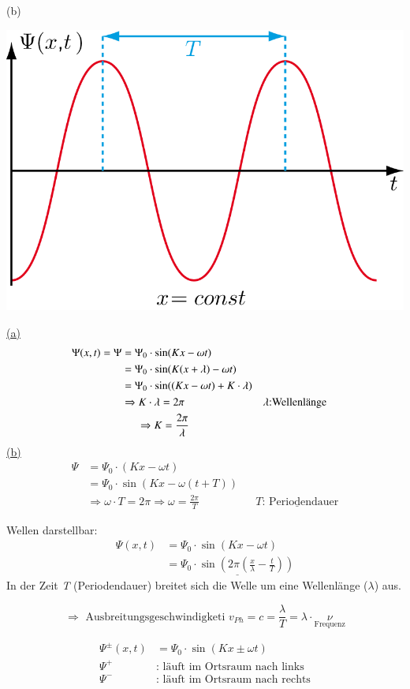 \hypertarget{b}{(b)} \begin{center}
	\includegraphics[width=0.5\linewidth]{skizzen/19/19B10}
\end{center}
\hyperlink{a}{(a)}
\begin{align*}
\Psi(x,t) = \Psi &= \Psi_0 \cdot \sin(Kx-\omega t)\\
&= \Psi_0 \cdot \sin(K(x+\lambda)-\omega t)\\
&= \Psi_0 \cdot \sin((Kx-\omega t)+K\cdot \lambda)\\
&\Rightarrow K \cdot \lambda = 2\pi &&\lambda \text{:Wellenlänge}\\
&\hspace{5mm} \Rightarrow K = \frac{2\pi}{\lambda}
\end{align*}
\hyperlink{b}{(b)}
\begin{align*}
\Psi &= \Psi_0 \cdot (Kx-\omega t)\\
&= \Psi_0 \cdot \sin(Kx-\omega (t+T))\\
&\Rightarrow\omega \cdot T = 2\pi \Rightarrow \omega = \frac{2\pi}{T} && \underline{T\text{: Periodendauer}}
\end{align*}

Wellen darstellbar:
\begin{align*}
\Psi(x,t) &= \Psi_0 \cdot \sin(Kx-\omega t)\\
&= \underline{\Psi_0 \cdot \sin (2\pi(\frac{x}{\lambda} - \frac{t}{T}))}
\end{align*}
In der Zeit \emph{T} (Periodendauer) breitet sich die Welle um eine Wellenlänge ($ \lambda $) aus.

$$ \Rightarrow \text{ Ausbreitungsgeschwindigketi } \boxed{ v_{Ph} = c = \frac{\lambda}{T} = \lambda \cdot \underset{\text{Frequenz}}{\nu} } $$

\begin{align*}
\Psi^{\pm}(x,t)&=\Psi_0 \cdot \sin(Kx\pm\omega t)\\
\Psi^{+} &\text{: läuft im Ortsraum nach links}\\
\Psi^{-} &\text{: läuft im Ortsraum nach rechts}
\end{align*}
